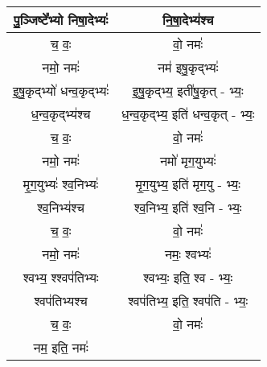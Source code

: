 {\begin{longtable}{|c|c|}
\hline
पु॒ञ्जिष्टे᳚भ्यो निषा॒देभ्यः॑            & नि॒षा॒देभ्य॑श्च\\
\hline
च॒ वः॒                          & वो॒ नमः॑\\
\hline
नमो॒ नमः॑                       & नम॑ इषु॒कृद्भ्यः॑\\
\hline
इ॒षु॒कृद्भ्यो॑ धन्व॒कृद्भ्यः॑              & इ॒षु॒कृद्भ्य॒ इती॑षु॒कृत् - भ्यः॒\\
\hline
ध॒न्व॒कृद्भ्य॑श्च                     & ध॒न्व॒कृद्भ्य॒ इति॑ धन्व॒कृत् - भ्यः॒\\
\hline
च॒ वः॒                          & वो॒ नमः॑\\
\hline
नमो॒ नमः॑                       & नमो॑ मृग॒युभ्यः॑\\
\hline
मृ॒ग॒युभ्यः॑ श्व॒निभ्यः॑                & मृ॒ग॒युभ्य॒ इति॑ मृग॒यु - भ्यः॒\\
\hline
श्व॒निभ्य॑श्च                      & श्व॒निभ्य॒ इति॑ श्व॒नि - भ्यः॒\\
\hline
च॒ वः॒                          & वो॒ नमः॑\\
\hline
नमो॒ नमः॑                       & नमः॒ श्वभ्यः॑\\
\hline
श्वभ्य॒ श्श्वप॑तिभ्यः                & श्वभ्यः॒ इति॒ श्व - भ्यः॒\\
\hline
श्वप॑तिभ्यश्च                     & श्वप॑तिभ्य॒ इति॒ श्वप॑ति - भ्यः॒\\
\hline
च॒ वः॒                          & वो॒ नमः॑\\
\hline
नम॒ इति॒ नमः॑\\
\hline
\end{longtable}
}

